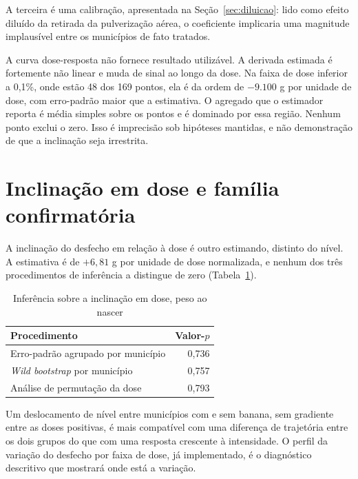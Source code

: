 A terceira é uma calibração, apresentada na Seção~\ref{sec:diluicao}: lido como
efeito diluído da retirada da pulverização aérea, o coeficiente implicaria uma
magnitude implausível entre os municípios de fato tratados.

A curva dose-resposta não fornece resultado utilizável. A derivada estimada é
fortemente não linear e muda de sinal ao longo da dose. Na faixa de dose
inferior a 0,1\%, onde estão 48 dos 169 pontos, ela é da ordem de $-9.100$ g
por unidade de dose, com erro-padrão maior que a estimativa. O agregado que o
estimador reporta é média simples sobre os pontos e é dominado por essa região.
Nenhum ponto exclui o zero. Isso é imprecisão sob hipóteses mantidas, e não
demonstração de que a inclinação seja irrestrita.

\section{Inclinação em dose e família confirmatória}
\label{sec:res-inclinacao}

A inclinação do desfecho em relação à dose é outro estimando, distinto do
nível. A estimativa é de $+6{,}81$ g por unidade de dose normalizada, e nenhum
dos três procedimentos de inferência a distingue de zero
(Tabela~\ref{tab:inferencia}).

\begin{table}[htb]
\centering
\caption{Inferência sobre a inclinação em dose, peso ao nascer}
\label{tab:inferencia}
\small
\begin{tabular}{lr}
\toprule
Procedimento & Valor-$p$ \\
\midrule
Erro-padrão agrupado por município     & 0,736 \\
\emph{Wild bootstrap} por município    & 0,757 \\
Análise de permutação da dose          & 0,793 \\
\bottomrule
\end{tabular}
\end{table}

Um deslocamento de nível entre municípios com e sem banana, sem gradiente entre
as doses positivas, é mais compatível com uma diferença de trajetória entre os
dois grupos do que com uma resposta crescente à intensidade. O perfil da
variação do desfecho por faixa de dose, já implementado, é o diagnóstico
descritivo que mostrará onde está a variação.

